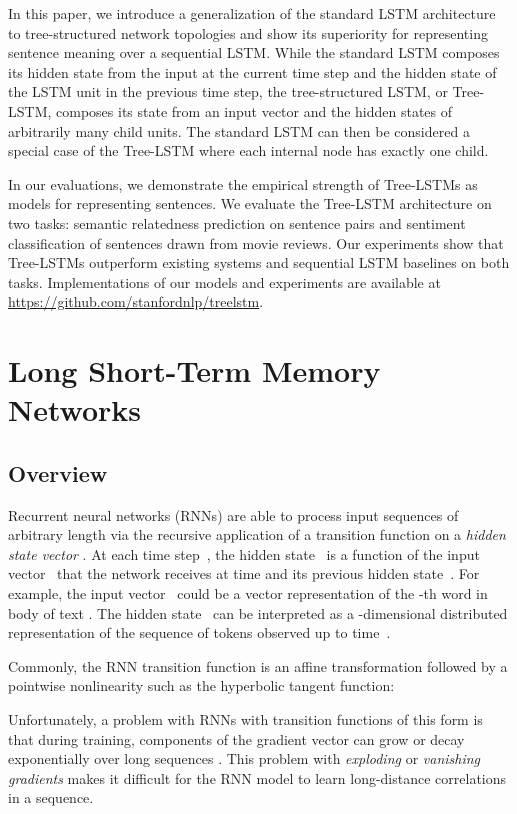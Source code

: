 \documentclass[11pt]{article}
\begin{document}
In this paper, we introduce a generalization of the standard LSTM architecture to tree-structured network topologies and show its superiority for representing sentence meaning over a sequential LSTM. While the standard LSTM composes its hidden state from the input at the current time step and the hidden state of the LSTM unit in the previous time step, the tree-structured LSTM, or Tree-LSTM, composes its state from an input vector and the hidden states of arbitrarily many child units. The standard LSTM can then be considered a special case of the Tree-LSTM where each internal node has exactly one child.

In our evaluations, we demonstrate the empirical strength of Tree-LSTMs as models for representing sentences. We evaluate the Tree-LSTM architecture on two tasks: semantic relatedness prediction on sentence pairs and sentiment classification of sentences drawn from movie reviews. Our experiments show that Tree-LSTMs outperform existing systems and sequential LSTM baselines on both tasks. Implementations of our models and experiments are available at \url{https://github.com/stanfordnlp/treelstm}.

\section{Long Short-Term Memory Networks}
\label{sec:lstms}

\subsection{Overview}

Recurrent neural networks (RNNs) are able to process input sequences of arbitrary length via the recursive application of a transition function on a \emph{hidden state vector} . At each time step~, the hidden state~ is a function of the input vector~ that the network receives at time  and its previous hidden state~. For example, the input vector~ could be a vector representation of the -th word in body of text \citep{elman1990finding,mikolov2012statistical}. The hidden state~ can be interpreted as a -dimensional distributed representation of the sequence of tokens observed up to time~.

Commonly, the RNN transition function is an affine transformation followed by a pointwise nonlinearity such as the hyperbolic tangent function:

Unfortunately, a problem with RNNs with transition functions of this form is that during training, components of the gradient vector can grow or decay exponentially over long sequences \citep{hochreiter1998vanishing,bengio1994learning}.  
This problem with \emph{exploding} or \emph{vanishing gradients} makes it difficult for the RNN model to learn long-distance correlations in a sequence.
\end{document}
